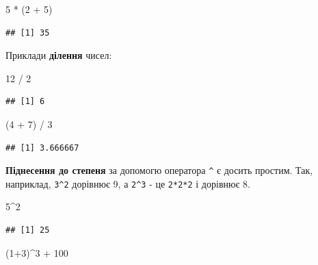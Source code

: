 \documentclass[
]{book}
\newenvironment{Shaded}{\begin{snugshade}}{\end{snugshade}}
\newcommand{\DecValTok}[1]{\textcolor[rgb]{0.00,0.00,0.81}{#1}}
\newcommand{\NormalTok}[1]{#1}
\newcommand{\SpecialCharTok}[1]{\textcolor[rgb]{0.00,0.00,0.00}{#1}}
\begin{document}
\begin{Shaded}
\begin{Highlighting}[]
\DecValTok{5} \SpecialCharTok{*}\NormalTok{ (}\DecValTok{2} \SpecialCharTok{+} \DecValTok{5}\NormalTok{)}
\end{Highlighting}
\end{Shaded}

\begin{verbatim}
## [1] 35
\end{verbatim}

Приклади \textbf{ділення} чисел:

\begin{Shaded}
\begin{Highlighting}[]
\DecValTok{12} \SpecialCharTok{/} \DecValTok{2}
\end{Highlighting}
\end{Shaded}

\begin{verbatim}
## [1] 6
\end{verbatim}

\begin{Shaded}
\begin{Highlighting}[]
\NormalTok{(}\DecValTok{4} \SpecialCharTok{+} \DecValTok{7}\NormalTok{) }\SpecialCharTok{/} \DecValTok{3}
\end{Highlighting}
\end{Shaded}

\begin{verbatim}
## [1] 3.666667
\end{verbatim}

\textbf{Піднесення до степеня} за допомогю оператора \texttt{\^{}} є досить простим. Так, наприклад, \texttt{3\^{}2} дорівнює 9, а \texttt{2\^{}3} - це \texttt{2*2*2} і дорівнює 8.

\begin{Shaded}
\begin{Highlighting}[]
\DecValTok{5}\SpecialCharTok{\^{}}\DecValTok{2}
\end{Highlighting}
\end{Shaded}

\begin{verbatim}
## [1] 25
\end{verbatim}

\begin{Shaded}
\begin{Highlighting}[]
\NormalTok{(}\DecValTok{1}\SpecialCharTok{+}\DecValTok{3}\NormalTok{)}\SpecialCharTok{\^{}}\DecValTok{3} \SpecialCharTok{+} \DecValTok{100} 
\end{Highlighting}
\end{Shaded}
\end{document}
